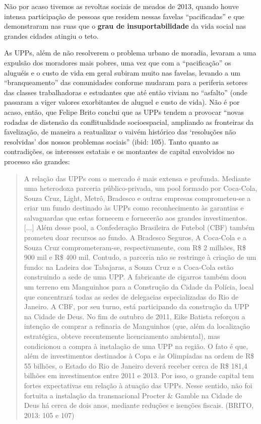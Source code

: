 Não por acaso tivemos as revoltas sociais de meados de 2013, quando
houve intensa participação de pessoas que residem nessas favelas
``pacificadas'' e que demonstraram nas ruas que o \textbf{grau de
insuportabilidade} da vida social nas grandes cidades atingiu o teto.

As UPPs, além de não resolverem o problema urbano de moradia, levaram a
uma expulsão dos moradores mais pobres, uma vez que com a
``pacificação'' os aluguéis e o custo de vida em geral subiram muito nas
favelas, levando a um ``branqueamento'' das comunidades conforme mudaram
para a periferia setores das classes trabalhadoras e estudantes que até
então viviam no ``asfalto'' (onde passaram a viger valores exorbitantes
de aluguel e custo de vida). Não é por acaso, então, que Felipe Brito
conclui que as UPPs tendem a provocar ``novas rodadas de distensão da
conflitualidade socioespacial, ampliando as fronteiras da favelização,
de maneira a reatualizar o vaivém histórico das `resoluções não
resolvidas' dos nossos problemas sociais'' (ibid: 105). Tanto quanto as
contradições, os interesses estatais e os montantes de capital
envolvidos no processo são grandes:

\begin{quote}
A relação das UPPs com o mercado é mais extensa e profunda. Mediante uma
heterodoxa parceria público-privada, um pool formado por Coca-Cola,
Souza Cruz, Light, Metrô, Bradesco e outras empresas comprometeu-se a
criar um fundo destinado às UPPs como reconhecimento às garantias e
salvaguardas que estas fornecem e fornecerão aos grandes investimentos.
{[}...{]} Além desse pool, a Confederação Brasileira de Futebol (CBF)
também prometeu doar recursos ao fundo. A Bradesco Seguros, A Coca-Cola
e a Souza Cruz comprometeram-se, respectivamente, com R\$ 2 milhões, R\$
900 mil e R\$ 400 mil. Contudo, a parceria não se restringe à criação de
um fundo: na Ladeira dos Tabajaras, a Souza Cruz e a Coca-Cola estão
construindo a sede de uma UPP. A fabricante de cigarros também doou um
terreno em Manguinhos para a Construção da Cidade da Polícia, local que
concentrará todas as sedes de delegacias especializadas do Rio de
Janeiro. A CBF, por seu turno, está participando da construção da UPP na
Cidade de Deus. No fim de outubro de 2011, Eike Batista reforçou a
intenção de comprar a refinaria de Manguinhos (que, além da localização
estratégica, obteve recentemente licenciamento ambiental), mas
condicionou a compra à instalação de uma UPP na região. O fato é que,
além de investimentos destinados à Copa e às Olimpíadas na ordem de R\$
55 bilhões, o Estado do Rio de Janeiro deverá receber cerca de R\$ 181,4
bilhões em investimentos entre 2011 e 2013. Por isso, o grande capital
tem fortes expectativas em relação à atuação das UPPs. Nesse sentido,
não foi fortuita a instalação da transnacional Procter \& Gamble na
Cidade de Deus há cerca de dois anos, mediante reduções e isenções
fiscais. (BRITO, 2013: 105 e 107)
\end{quote}

